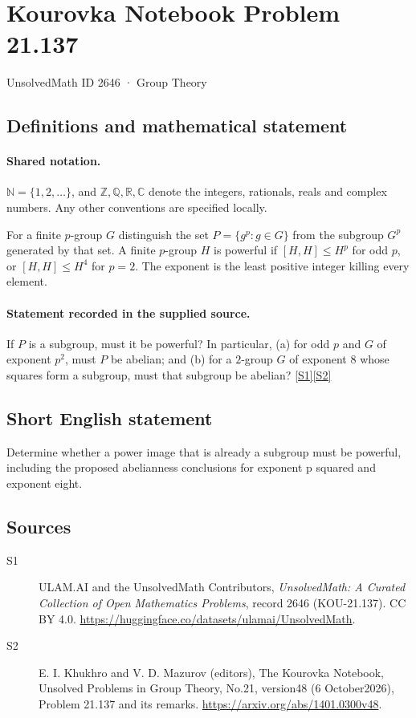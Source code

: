 \documentclass[11pt]{article}
\newcommand{\sref}[2]{\hyperlink{source:#1:#2}{[S#2]}}
\begin{document}
\setcounter{section}{2645}
\section{Kourovka Notebook Problem 21.137}\label{2646}
{\small\sffamily UnsolvedMath ID 2646 · Group Theory}
\subsection{Definitions and mathematical statement}

\paragraph{Shared notation.}$\mathbb N=\{1,2,\ldots\}$, and $\mathbb Z,\mathbb Q,\mathbb R,\mathbb C$ denote the integers, rationals, reals and complex numbers. Any other conventions are specified locally.


For a finite $p$-group $G$ distinguish the set $P=\{g^p:g\in G\}$ from the subgroup $G^p$ generated by that set. A finite $p$-group $H$ is powerful if $[H,H]\leq H^p$ for odd $p$, or $[H,H]\leq H^4$ for $p=2$. The exponent is the least positive integer killing every element.
\paragraph{Statement recorded in the supplied source.}
If $P$ is a subgroup, must it be powerful? In particular, (a) for odd $p$ and $G$ of exponent $p^2$, must $P$ be abelian; and (b) for a $2$-group $G$ of exponent $8$ whose squares form a subgroup, must that subgroup be abelian? \sref{2646}{1}\sref{2646}{2}
\subsection{Short English statement}
Determine whether a power image that is already a subgroup must be powerful, including the proposed abelianness conclusions for exponent p squared and exponent eight.
\subsection{Sources}
\begin{description}
\item[\hypertarget{source:2646:1}{S1}] ULAM.AI and the UnsolvedMath Contributors, \emph{UnsolvedMath: A Curated Collection of Open Mathematics Problems}, record 2646 (KOU-21.137). CC BY 4.0. \url{https://huggingface.co/datasets/ulamai/UnsolvedMath}.
\item[\hypertarget{source:2646:2}{S2}] E. I. Khukhro and V. D. Mazurov (editors), The Kourovka Notebook, Unsolved Problems in Group Theory, No.21, version48 (6 October2026), Problem 21.137 and its remarks. \url{https://arxiv.org/abs/1401.0300v48}.
\end{description}
\label{end:2646}
\end{document}
